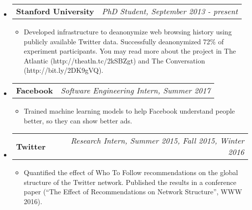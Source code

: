 \documentclass[letterpaper,10pt]{article}
\makeatletter
\newcommand{\ressubheading}[4]{
\begin{tabular*}{7.0in}{l@{\extracolsep{\fill}}r}
		\textbf{#1} & \textit{#4} \\
\end{tabular*}\vspace{-6pt}}
\makeatother
\begin{document}
\begin{itemize}
\item
	\ressubheading{Stanford University}{Stanford, CA}{PhD Student}{PhD Student, September 2013 - present}
	\begin{itemize}
	\item Developed infrastructure to deanonymize web browsing history using publicly available Twitter data.  Successfully deanonymized 72\% of experiment participants.  You may read more about the project in The Atlantic (http://theatln.tc/2kSBZgt) and The Conversation (http://bit.ly/2DK9gVQ).
	\end{itemize}
\item
	\ressubheading{Facebook}{Seattle, WA}{Software Engineering Intern}{Software Engineering Intern, Summer 2017}
	\begin{itemize}
	\item Trained machine learning models to help Facebook understand people better, so they can show better ads.
	\end{itemize}
\item
	\ressubheading{Twitter}{San Francisco, CA}{Research Intern}{Research Intern, Summer 2015, Fall 2015, Winter 2016}
	\begin{itemize}
\item Quantified the effect of Who To Follow recommendations on the global structure of the Twitter network.  Published the results in a conference paper (``The Effect of Recommendations on Network Structure'', WWW 2016).


\end{itemize}
\end{itemize}
\end{document}
